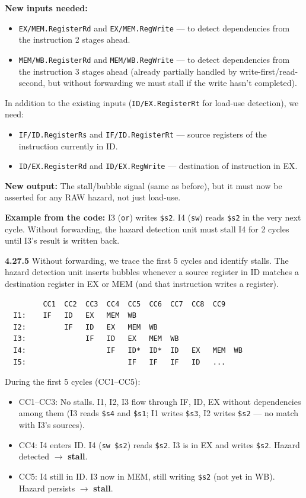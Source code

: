 \textbf{New inputs needed:}
\begin{itemize}
  \item \texttt{EX/MEM.RegisterRd} and \texttt{EX/MEM.RegWrite} --- to detect
    dependencies from the instruction 2 stages ahead.
  \item \texttt{MEM/WB.RegisterRd} and \texttt{MEM/WB.RegWrite} --- to detect
    dependencies from the instruction 3 stages ahead (already partially handled
    by write-first/read-second, but without forwarding we must stall if the
    write hasn't completed).
\end{itemize}

In addition to the existing inputs (\texttt{ID/EX.RegisterRt} for load-use
detection), we need:
\begin{itemize}
  \item \texttt{IF/ID.RegisterRs} and \texttt{IF/ID.RegisterRt} --- source
    registers of the instruction currently in ID.
  \item \texttt{ID/EX.RegisterRd} and \texttt{ID/EX.RegWrite} --- destination
    of instruction in EX.
\end{itemize}

\textbf{New output:} The stall/bubble signal (same as before), but it must now
be asserted for any RAW hazard, not just load-use.

\textbf{Example from the code:} I3 (\texttt{or}) writes \texttt{\$s2}. I4
(\texttt{sw}) reads \texttt{\$s2} in the very next cycle. Without forwarding,
the hazard detection unit must stall I4 for 2 cycles until I3's result is
written back.

\medskip\noindent\textbf{4.27.5}
Without forwarding, we trace the first 5 cycles and identify stalls. The
hazard detection unit inserts bubbles whenever a source register in ID matches
a destination register in EX or MEM (and that instruction writes a register).

\begin{verbatim}
         CC1  CC2  CC3  CC4  CC5  CC6  CC7  CC8  CC9
  I1:    IF   ID   EX   MEM  WB
  I2:         IF   ID   EX   MEM  WB
  I3:              IF   ID   EX   MEM  WB
  I4:                   IF   ID*  ID*  ID   EX   MEM  WB
  I5:                        IF   IF   IF   ID   ...
\end{verbatim}

During the first 5 cycles (CC1--CC5):

\begin{itemize}
  \item CC1--CC3: No stalls. I1, I2, I3 flow through IF, ID, EX without
    dependencies among them (I3 reads \texttt{\$s4} and \texttt{\$s1}; I1 writes
    \texttt{\$s3}, I2 writes \texttt{\$s2} --- no match with I3's sources).
  \item CC4: I4 enters ID. I4 (\texttt{sw \$s2}) reads \texttt{\$s2}. I3 is
    in EX and writes \texttt{\$s2}. Hazard detected $\to$ \textbf{stall}.
  \item CC5: I4 still in ID. I3 now in MEM, still writing \texttt{\$s2} (not
    yet in WB). Hazard persists $\to$ \textbf{stall}.
\end{itemize}

